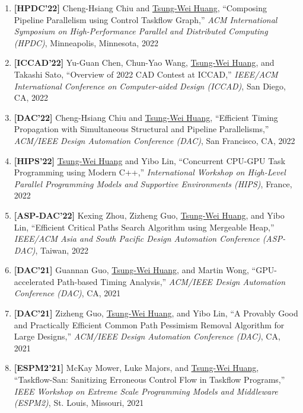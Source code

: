 \documentclass[A4,11pt]{article}
\begin{document}
\begin{enumerate}
    \item \textbf{[HPDC'22]} Cheng-Hsiang Chiu and \underline{Tsung-Wei Huang}, ``Composing Pipeline Parallelism using Control Taskflow Graph,'' \textit{ACM International Symposium on High-Performance Parallel and Distributed Computing (HPDC)}, Minneapolis, Minnesota, 2022

    \item \textbf{[ICCAD'22]} Yu-Guan Chen, Chun-Yao Wang, \underline{Tsung-Wei Huang}, and Takashi Sato, ``Overview of 2022 CAD Contest at ICCAD,'' \textit{IEEE/ACM International Conference on Computer-aided Design (ICCAD)}, San Diego, CA, 2022

    \item \textbf{[DAC'22]} Cheng-Hsiang Chiu and \underline{Tsung-Wei Huang}, ``Efficient Timing Propagation with Simultaneous Structural and Pipeline Parallelisms,'' \textit{ACM/IEEE Design Automation Conference (DAC)}, San Francisco, CA, 2022 

    \item \textbf{[HIPS'22]} \underline{Tsung-Wei Huang} and Yibo Lin, ``Concurrent CPU-GPU Task Programming using Modern C++,'' \textit{International Workshop on High-Level Parallel Programming Models and Supportive Environments (HIPS)}, France, 2022

    \item \textbf{[ASP-DAC'22]} Kexing Zhou, Zizheng Guo, \underline{Tsung-Wei Huang}, and Yibo Lin, ``Efficient Critical Paths Search Algorithm using Mergeable Heap,'' \textit{IEEE/ACM Asia and South Pacific Design Automation Conference (ASP-DAC)}, Taiwan, 2022

    \item \textbf{[DAC'21]} Guannan Guo, \underline{Tsung-Wei Huang}, and Martin Wong, ``GPU-accelerated Path-based Timing Analysis,'' \textit{ACM/IEEE Design Automation Conference (DAC)}, CA, 2021

    \item \textbf{[DAC'21]} Zizheng Guo, \underline{Tsung-Wei Huang}, and Yibo Lin, ``A Provably Good and Practically Efficient Common Path Pessimism Removal Algorithm for Large Designs,'' \textit{ACM/IEEE Design Automation Conference (DAC)}, CA, 2021

    \item \textbf{[ESPM2'21]} McKay Mower, Luke Majors, and \underline{Tsung-Wei Huang}, ``Taskflow-San: Sanitizing Erroneous Control Flow in Taskflow Programs,'' \textit{IEEE Workshop on Extreme Scale Programming Models and Middleware (ESPM2)}, St. Louis, Missouri, 2021


\end{enumerate}
\end{document}
